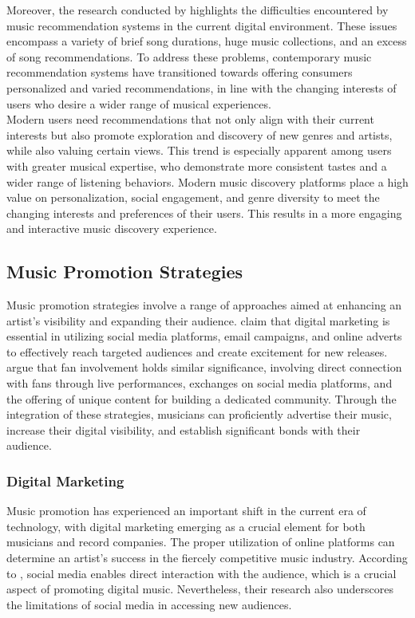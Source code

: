 Moreover, the research conducted by \textcite{perera20} highlights the difficulties encountered by music recommendation systems in the current digital environment. These issues encompass a variety of brief song durations, huge music collections, and an excess of song recommendations. To address these problems, contemporary music recommendation systems have transitioned towards offering consumers personalized and varied recommendations, in line with the changing interests of users who desire a wider range of musical experiences. \\

Modern users need recommendations that not only align with their current interests but also promote exploration and discovery of new genres and artists, while also valuing certain views. This trend is especially apparent among users with greater musical expertise, who demonstrate more consistent tastes and a wider range of listening behaviors. Modern music discovery platforms place a high value on personalization, social engagement, and genre diversity to meet the changing interests and preferences of their users. This results in a more engaging and interactive music discovery experience. \pagebreak

\subsection{Music Promotion Strategies}
Music promotion strategies involve a range of approaches aimed at enhancing an artist's visibility and expanding their audience. \textcite{haynes18} claim that digital marketing is essential in utilizing social media platforms, email campaigns, and online adverts to effectively reach targeted audiences and create excitement for new releases. \textcite{edlom21} argue that fan involvement holds similar significance, involving direct connection with fans through live performances, exchanges on social media platforms, and the offering of unique content for building a dedicated community. Through the integration of these strategies, musicians can proficiently advertise their music, increase their digital visibility, and establish significant bonds with their audience.

\subsubsection{Digital Marketing}
Music promotion has experienced an important shift in the current era of technology, with digital marketing emerging as a crucial element for both musicians and record companies. The proper utilization of online platforms can determine an artist's success in the fiercely competitive music industry. According to \textcite{haynes18}, social media enables direct interaction with the audience, which is a crucial aspect of promoting digital music. Nevertheless, their research also underscores the limitations of social media in accessing new audiences. \\

